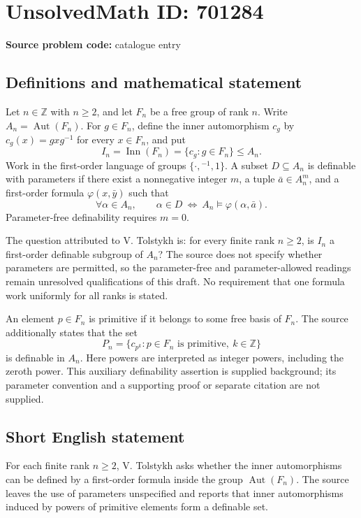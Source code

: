 \documentclass[11pt]{article}
\newcommand{\Z}{\mathbb{Z}}
\begin{document}
\section*{UnsolvedMath ID: 701284}
\textbf{Source problem code:} catalogue entry
\subsection{Definitions and mathematical statement}
Let \(n\in\Z\) with \(n\geq 2\), and let \(F_n\) be a free group of rank \(n\). Write \(A_n=\operatorname{Aut}(F_n)\). For \(g\in F_n\), define the inner automorphism \(c_g\) by \(c_g(x)=gxg^{-1}\) for every \(x\in F_n\), and put
\[
I_n=\operatorname{Inn}(F_n)=\{c_g:g\in F_n\}\leq A_n.
\]
Work in the first-order language of groups \(\{\cdot,{}^{-1},1\}\). A subset \(D\subseteq A_n\) is definable with parameters if there exist a nonnegative integer \(m\), a tuple \(\bar a\in A_n^m\), and a first-order formula \(\varphi(x,\bar y)\) such that
\[
\forall\alpha\in A_n,\qquad \alpha\in D\ \Longleftrightarrow\ A_n\models\varphi(\alpha,\bar a).
\]
Parameter-free definability requires \(m=0\).

The question attributed to V. Tolstykh is: for every finite rank \(n\geq 2\), is \(I_n\) a first-order definable subgroup of \(A_n\)? The source does not specify whether parameters are permitted, so the parameter-free and parameter-allowed readings remain unresolved qualifications of this draft. No requirement that one formula work uniformly for all ranks is stated.

An element \(p\in F_n\) is primitive if it belongs to some free basis of \(F_n\). The source additionally states that the set
\[
P_n=\{c_{p^k}:p\in F_n\text{ is primitive},\ k\in\Z\}
\]
is definable in \(A_n\). Here powers are interpreted as integer powers, including the zeroth power. This auxiliary definability assertion is supplied background; its parameter convention and a supporting proof or separate citation are not supplied.
\subsection{Short English statement}
For each finite rank \(n\geq 2\), V. Tolstykh asks whether the inner automorphisms can be defined by a first-order formula inside the group \(\operatorname{Aut}(F_n)\). The source leaves the use of parameters unspecified and reports that inner automorphisms induced by powers of primitive elements form a definable set.
\end{document}

